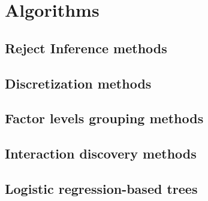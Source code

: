 \chapter{Algorithms}


\section{Reject Inference methods}


\section{Discretization methods}


\section{Factor levels grouping methods}


\section{Interaction discovery methods}


\section{Logistic regression-based trees}

